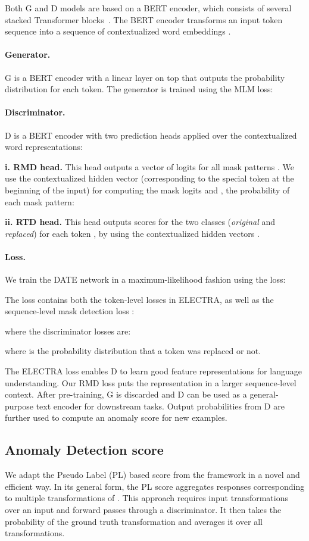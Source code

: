 \documentclass[11pt]{article}
\begin{document}
Both G and D models are based on a BERT encoder, which consists of several stacked Transformer blocks~\cite{Vaswani2017}. The BERT encoder transforms an input token sequence  into a sequence of contextualized word embeddings .

\paragraph{Generator.} G is a BERT encoder with a linear layer on top that outputs the probability distribution  for each token. The generator is trained using the MLM loss:


\paragraph{Discriminator.} D is a BERT encoder with two prediction heads applied over the contextualized word representations:

\noindent \textbf{i. RMD head.} This head outputs a vector of logits for all mask patterns . We use the contextualized hidden vector  (corresponding to the  special token at the beginning of the input) for computing the mask logits  and , the probability of each mask pattern:


\noindent \textbf{ii. RTD head.} This head outputs scores for the two classes (\emph{original} and \emph{replaced}) for each token , by using the contextualized hidden vectors .

\paragraph{Loss.} We train the DATE network in a maximum-likelihood fashion using the  loss:


\noindent The loss contains both the token-level losses in ELECTRA, as well as the sequence-level mask detection loss :

where the discriminator losses are:

where  is the probability distribution that a token was replaced or not.

The ELECTRA loss enables D to learn good feature representations for language understanding. Our RMD loss puts the representation in a larger sequence-level context. After pre-training, G is discarded and D can be used as a general-purpose text encoder for downstream tasks. Output probabilities from D are further used to compute an anomaly score for new examples.

\subsection{Anomaly Detection score}
\label{sec:pl_score}
We adapt the Pseudo Label (PL) based score from the \emph{} framework \cite{neurips2019} in a novel and efficient way. In its general form, the PL score aggregates responses corresponding to multiple transformations of . This approach requires  input transformations over an input  and  forward passes through a discriminator. It then takes the probability of the ground truth transformation and averages it over all  transformations. 
\end{document}
